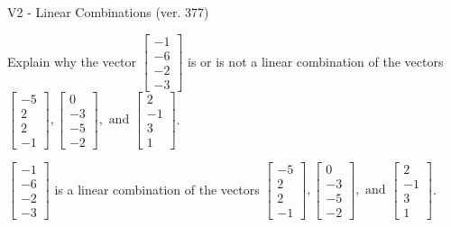 \begin{exercise}
  \begin{exerciseTitle}V2 - Linear Combinations (ver. 377)\end{exerciseTitle}
  \begin{exerciseStatement}
    Explain why the vector \(\left[\begin{array}{c}
-1 \\
-6 \\
-2 \\
-3
\end{array}\right]\)  is or is not a linear 
	combination of the vectors \(\left[\begin{array}{c}
-5 \\
2 \\
2 \\
-1
\end{array}\right] , \left[\begin{array}{c}
0 \\
-3 \\
-5 \\
-2
\end{array}\right] , \text{ and } \left[\begin{array}{c}
2 \\
-1 \\
3 \\
1
\end{array}\right]\).
	


  \end{exerciseStatement}
  \begin{exerciseAnswer}
   \(\left[\begin{array}{c}
-1 \\
-6 \\
-2 \\
-3
\end{array}\right]\) 
  	 is  
	a linear combination of the vectors \(\left[\begin{array}{c}
-5 \\
2 \\
2 \\
-1
\end{array}\right] , \left[\begin{array}{c}
0 \\
-3 \\
-5 \\
-2
\end{array}\right] , \text{ and } \left[\begin{array}{c}
2 \\
-1 \\
3 \\
1
\end{array}\right]\).

	
  


  \end{exerciseAnswer}
\end{exercise}